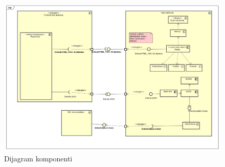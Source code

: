 			  \begin{figure}[htb]
			 	\centering
			 	\includegraphics[width=15cm]{slike/Dijagram_komponensti.jpg}
			 	\caption{Dijagram komponenti}
			 	\label{fig:fer-logo}
			 \end{figure}